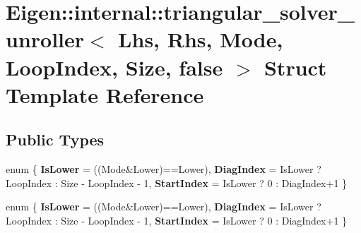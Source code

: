 \hypertarget{struct_eigen_1_1internal_1_1triangular__solver__unroller_3_01_lhs_00_01_rhs_00_01_mode_00_01_looefec01585c67928d42a9958d8c8f161e}{}\section{Eigen\+:\+:internal\+:\+:triangular\+\_\+solver\+\_\+unroller$<$ Lhs, Rhs, Mode, Loop\+Index, Size, false $>$ Struct Template Reference}
\label{struct_eigen_1_1internal_1_1triangular__solver__unroller_3_01_lhs_00_01_rhs_00_01_mode_00_01_looefec01585c67928d42a9958d8c8f161e}
\subsection*{Public Types}
\begin{DoxyCompactItemize}
\item 
\mbox{\label{struct_eigen_1_1internal_1_1triangular__solver__unroller_3_01_lhs_00_01_rhs_00_01_mode_00_01_looefec01585c67928d42a9958d8c8f161e_ad85f73931bd46b3528b67a1490df294f}} 
enum \{ {\bfseries Is\+Lower} = ((Mode\&Lower)==Lower), 
{\bfseries Diag\+Index} = Is\+Lower ? Loop\+Index \+: Size -\/ Loop\+Index -\/ 1, 
{\bfseries Start\+Index} = Is\+Lower ? 0 \+: Diag\+Index+1
 \}
\item 
\mbox{\label{struct_eigen_1_1internal_1_1triangular__solver__unroller_3_01_lhs_00_01_rhs_00_01_mode_00_01_looefec01585c67928d42a9958d8c8f161e_adf523d78baf364a4315ac6cb3804412f}} 
enum \{ {\bfseries Is\+Lower} = ((Mode\&Lower)==Lower), 
{\bfseries Diag\+Index} = Is\+Lower ? Loop\+Index \+: Size -\/ Loop\+Index -\/ 1, 
{\bfseries Start\+Index} = Is\+Lower ? 0 \+: Diag\+Index+1
 \}
\end{DoxyCompactItemize}
